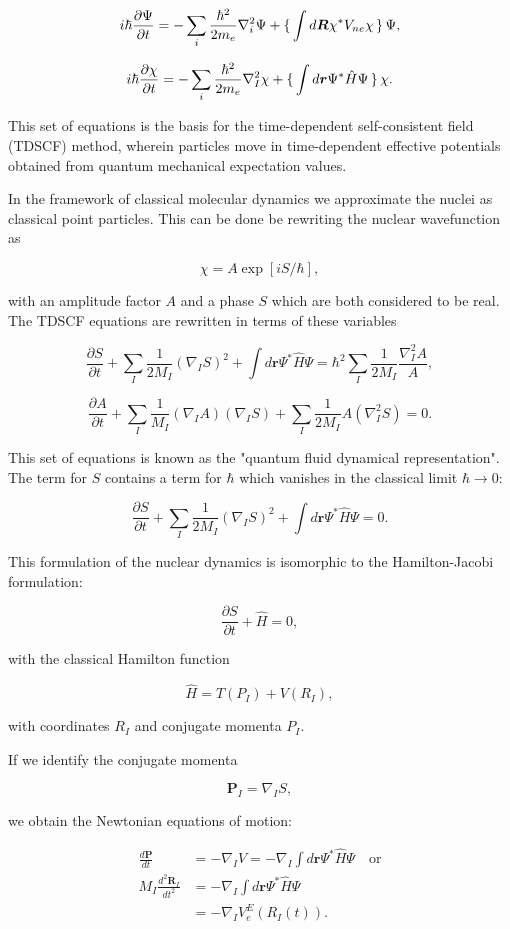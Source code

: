 $$ i\hbar \frac{\partial \Psi}{\partial t} 
    = -\sum_i \frac{\hbar^2}{2m_e} \nabla_i^2 \Psi
    + \set{ \int d\bm{R} \chi^* V_{ne} \chi } \Psi , $$

$$ i\hbar \frac{\partial \chi}{\partial t} 
    = -\sum_i \frac{\hbar^2}{2m_e} \nabla_I^2 \chi
    + \set{ \int d\bm{r} \Psi^* \hat{H} \Psi } \chi . $$

This set of equations is the basis for the time-dependent
self-consistent field (TDSCF) method, wherein particles move
in time-dependent effective potentials obtained from quantum
mechanical expectation values.
\par
In the framework of classical molecular dynamics
we approximate the nuclei as classical point particles.
This can be done be rewriting the nuclear wavefunction as

$$ \chi = A \exp[iS/\hbar] , $$

with an amplitude factor $A$ and a phase $S$
which are both considered to be real.
The TDSCF equations are rewritten in terms of these variables

$$ \frac{\partial S}{\partial t} + \sum_I \frac{1}{2M_I}
    (\nabla_I S)^2 + \int d\bm{r} \Psi^* \hat{H} \Psi
    = \hbar^2 \sum_I \frac{1}{2M_I} \frac{\nabla_I^2 A}{A} , $$

$$ \frac{\partial A}{\partial t} + \sum_I \frac{1}{M_I} (\nabla_I A)
    (\nabla_I S) + \sum_I \frac{1}{2M_I} A (\nabla_I^2 S) = 0 . $$

This set of equations is known as the "quantum fluid dynamical representation".
The term for $S$ contains a term for $\hbar$ which vanishes in
the classical limit $\hbar \rightarrow 0$:

$$ \frac{\partial S}{\partial t} + \sum_I \frac{1}{2M_I}
    (\nabla_I S)^2 + \int d\bm{r} \Psi^* \hat{H} \Psi = 0 . $$

This formulation of the nuclear dynamics is isomorphic
to the Hamilton-Jacobi formulation:

$$ \frac{\partial S}{\partial t} + \hat{H} = 0 , $$

with the classical Hamilton function

$$ \hat{H} = T(P_I) + V(R_I) , $$

with coordinates $R_I$ and conjugate momenta $P_I$.
\par
If we identify the conjugate momenta

$$ \bm{P}_I = \nabla_I S , $$

we obtain the Newtonian equations of motion:

\begin{equation}
    \begin{split}
        \frac{d\bm{P}}{dt} 
    &= -\nabla_I V
    = -\nabla_I \int d\bm{r} \Psi^* \hat{H} \Psi \quad \text{or} \\
        M_I\frac{d^2 \bm{R}_I}{dt^2}
    &= -\nabla_I \int d\bm{r} \Psi^* \hat{H} \Psi \\
    &= -\nabla_I V_e^E (R_I(t)) .
    \end{split}
\end{equation}

